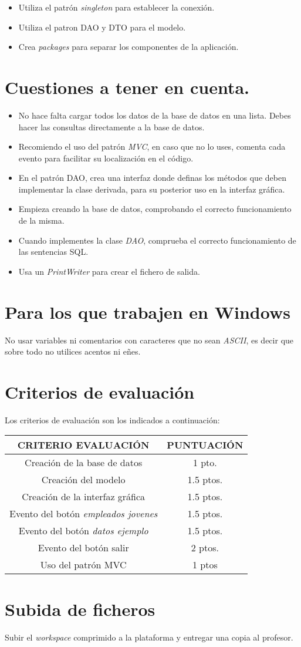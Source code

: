 \documentclass[4paper]{article}
\begin{document}
\begin{itemize}
\item Utiliza el patrón \emph{singleton} para establecer la conexión.
\item Utiliza el patron DAO y DTO para el modelo.
\item Crea \emph{packages} para separar los componentes de la aplicación.
\end{itemize}
\section*{Cuestiones a tener en cuenta.}
\begin{itemize}
\item No hace falta cargar todos los datos de la base de datos en una lista. Debes hacer las consultas directamente a la base de datos.
\item Recomiendo el uso del patrón \emph{MVC}, en caso que no lo uses, comenta cada evento para facilitar su localización en el código.
\item En el patrón DAO, crea una interfaz donde definas los métodos que deben implementar la clase derivada, para su posterior uso en la interfaz gráfica.
\item Empieza creando la base de datos, comprobando el correcto funcionamiento de la misma.
\item Cuando implementes la clase \emph{DAO}, comprueba el correcto funcionamiento de las sentencias SQL.
\item Usa un \emph{PrintWriter} para crear el fichero de salida.
\end{itemize}
\section*{Para los que trabajen en Windows}
No usar variables ni comentarios con caracteres que no sean \emph{ASCII}, es decir que sobre todo no utilices acentos ni eñes.

\section*{Criterios de evaluación}
Los criterios de evaluación son los indicados a continuación:\par 
\vspace*{0.5cm}
\begin{tabular}{|c|c|}
\hline
\textbf{CRITERIO EVALUACIÓN} & \textbf{PUNTUACIÓN} \\
\hline
Creación de la base de datos & 1 pto.\\
\hline
Creación del modelo & 1.5 ptos.\\
\hline
Creación de la interfaz gráfica & 1.5 ptos.\\
\hline
Evento del botón \emph{empleados jovenes }& 1.5 ptos.\\
\hline
Evento del botón \emph{datos ejemplo}& 1.5 ptos.\\
\hline
Evento del botón salir & 2 ptos.\\
\hline
Uso del patrón MVC  & 1 ptos\\
\hline
\end{tabular}
\section*{Subida de ficheros}
Subir el \emph{workspace} comprimido a la plataforma y entregar una copia al profesor.
\end{document}
